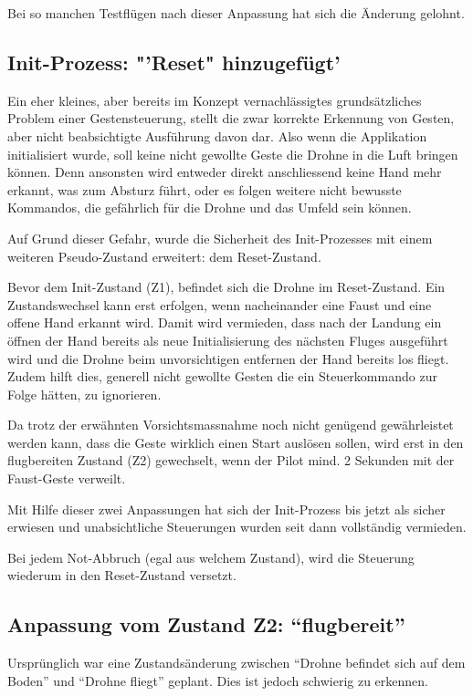 Bei so manchen Testflügen nach dieser Anpassung hat sich die Änderung gelohnt.

\subsection{Init-Prozess: "'Reset" hinzugefügt'}
Ein eher kleines, aber bereits im Konzept vernachlässigtes grundsätzliches Problem einer Gestensteuerung, stellt die zwar korrekte Erkennung von Gesten, aber nicht beabsichtigte Ausführung davon dar.
Also wenn die Applikation initialisiert wurde, soll keine nicht gewollte  Geste die Drohne in die Luft bringen können.
Denn ansonsten wird entweder direkt anschliessend keine Hand mehr erkannt, was zum Absturz führt, oder es folgen weitere nicht bewusste Kommandos, die gefährlich für die Drohne und das Umfeld sein können.

Auf Grund dieser Gefahr, wurde die Sicherheit des Init-Prozesses mit einem weiteren Pseudo-Zustand erweitert: dem Reset-Zustand.

Bevor dem Init-Zustand (Z1), befindet sich die Drohne im Reset-Zustand. Ein Zustandswechsel kann erst erfolgen, wenn nacheinander eine Faust und eine offene Hand erkannt wird. Damit wird vermieden, dass nach der Landung ein öffnen der Hand bereits als neue Initialisierung des nächsten Fluges ausgeführt wird und die Drohne beim unvorsichtigen entfernen der Hand bereits los fliegt.
Zudem hilft dies, generell nicht gewollte Gesten die ein Steuerkommando zur Folge hätten, zu ignorieren.

Da trotz der erwähnten Vorsichtsmassnahme noch nicht genügend gewährleistet werden kann, dass die Geste wirklich einen Start auslösen sollen, wird erst in den flugbereiten Zustand (Z2) gewechselt, wenn der Pilot mind. 2 Sekunden mit der Faust-Geste verweilt.

Mit Hilfe dieser zwei Anpassungen hat sich der Init-Prozess bis jetzt als sicher erwiesen und unabsichtliche Steuerungen wurden seit dann vollständig vermieden.

Bei jedem Not-Abbruch (egal aus welchem Zustand), wird die Steuerung wiederum in den Reset-Zustand versetzt.

\subsection{Anpassung vom Zustand Z2: "`flugbereit"'}
Ursprünglich war eine Zustandsänderung zwischen "`Drohne befindet sich auf dem Boden"' und "`Drohne fliegt"' geplant. Dies ist jedoch schwierig zu erkennen.

